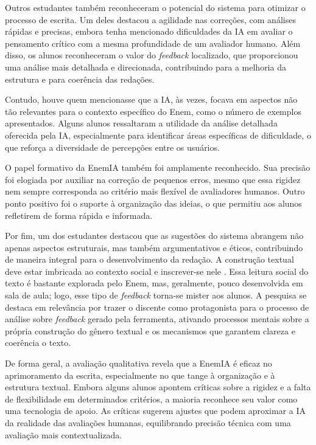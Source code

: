 \documentclass[portuguese]{textolivre}
\begin{document}
Outros estudantes também reconheceram o potencial do sistema para otimizar o processo de escrita. Um deles destacou a agilidade nas correções, com análises rápidas e precisas, embora tenha mencionado dificuldades da IA em avaliar o pensamento crítico com a mesma profundidade de um avaliador humano. Além disso, os alunos reconheceram o valor do \textit{feedback} localizado, que proporcionou uma análise mais detalhada e direcionada, contribuindo para a melhoria da estrutura e para coerência das redações. 

Contudo, houve quem mencionasse que a IA, às vezes, focava em aspectos não tão relevantes para o contexto específico do Enem, como o número de exemplos apresentados. Alguns alunos ressaltaram a utilidade da análise detalhada oferecida pela IA, especialmente para identificar áreas específicas de dificuldade, o que reforça a diversidade de percepções entre os usuários.

O papel formativo da EnemIA também foi amplamente reconhecido. Sua precisão foi elogiada por auxiliar na correção de pequenos erros, mesmo que essa rigidez nem sempre corresponda ao critério mais flexível de avaliadores humanos. Outro ponto positivo foi o suporte à organização das ideias, o que permitiu aos alunos refletirem de forma rápida e informada.

Por fim, um dos estudantes destacou que as sugestões do sistema abrangem não apenas aspectos estruturais, mas também argumentativos e éticos, contribuindo de maneira integral para o desenvolvimento da redação. A construção textual deve estar imbricada ao contexto social e inscrever-se nele \cite{dolz2010producao}. Essa leitura social do texto é bastante explorada pelo Enem, mas, geralmente, pouco desenvolvida em sala de aula; logo, esse tipo de \textit{feedback} torna-se mister aos alunos. A pesquisa se destaca em relevância por trazer o discente como protagonista para o processo de análise sobre \textit{feedback} gerado pela ferramenta, ativando processos mentais sobre a própria construção do gênero textual e os mecanismos que garantem clareza e coerência o texto.

De forma geral, a avaliação qualitativa revela que a EnemIA é eficaz no aprimoramento da escrita, especialmente no que tange à organização e à estrutura textual. Embora alguns alunos apontem críticas sobre a rigidez e a falta de flexibilidade em determinados critérios, a maioria reconhece seu valor como uma tecnologia de apoio. As críticas sugerem ajustes que podem aproximar a IA da realidade das avaliações humanas, equilibrando precisão técnica com uma avaliação mais contextualizada.
\end{document}
